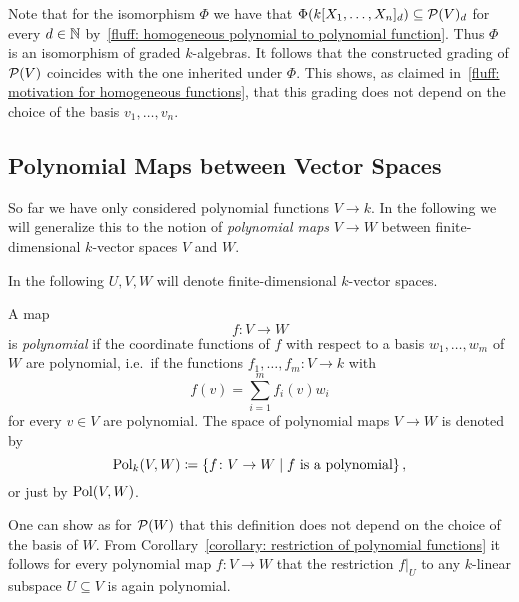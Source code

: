 \begin{fluff}
  Note that for the isomorphism $\Phi$ we have that $\Phi( k[X_1, \dotsc, X_n]_d ) \subseteq \mathcal{P}(V)_d$ for every $d \in \mathbb{N}$ by~\ref{fluff: homogeneous polynomial to polynomial function}.
  Thus $\Phi$ is an isomorphism of graded $k$-algebras.
  It follows that the constructed grading of $\mathcal{P}(V)$ coincides with the one inherited under $\Phi$.
  This shows, as claimed in~\ref{fluff: motivation for homogeneous functions}, that this grading does not depend on the choice of the basis $v_1, \dotsc, v_n$.
\end{fluff}







\subsection{Polynomial Maps between Vector Spaces}

\begin{fluff}
  So far we have only considered polynomial functions $V \to k$.
  In the following we will generalize this to the notion of \emph{polynomial maps} $V \to W$ between finite-dimensional $k$-vector spaces $V$ and $W$.
  
  In the following $U, V, W$ will denote finite-dimensional $k$-vector spaces.
\end{fluff}


\begin{definition}
  A map
  \[
            f
    \colon  V
    \to     W
  \]
  is \emph{polynomial} if the coordinate functions of $f$ with respect to a basis $w_1, \dotsc, w_m$ of $W$ are polynomial, i.e.\ if the functions $f_1, \dotsc, f_m \colon V \to k$ with
  \[
      f(v)
    = \sum_{i=1}^m f_i(v) w_i
  \]
  for every $v \in V$ are polynomial.
  The space of polynomial maps $V \to W$ is denoted by
  \[
              \operatorname{Pol}_k(V,W)
    \coloneqq  \{
                        f
                \colon  V
                \to     W
              \mid
                \text{$f$ is a polynomial}
              \} \,,
  \]
  or just by $\operatorname{Pol}(V,W)$.
\end{definition}


\begin{remark}
  One can show as for $\mathcal{P}(W)$ that this definition does not depend on the choice of the basis of $W$.
  From Corollary~\ref{corollary: restriction of polynomial functions} it follows for every polynomial map $f \colon V \to W$ that the restriction $f|_U$ to any $k$-linear subspace $U \subseteq V$ is again polynomial.
\end{remark}


